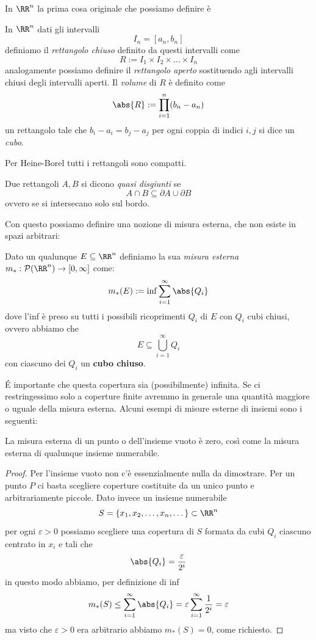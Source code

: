 \documentclass[11pt]{scrartcl}
\newcommand{\parti}[1]{\mathcal{P}\!\left(#1\right)}
\begin{document}
	In $\RR^n$ la prima cosa originale che possiamo definire è 
	\begin{definition}
		In $\RR^n$ dati gli intervalli
		$$I_n=\left[a_n,b_n\right]$$
		definiamo il \textit{rettangolo chiuso} definito da questi intervalli come
		$$R:= I_1\times I_2 \times \dots \times I_n$$
		analogamente possiamo definire il \textit{rettangolo aperto} sostituendo agli intervalli chiusi degli intervalli aperti. Il \textit{volume} di $R$ è definito come
		$$\abs{R}:= \prod_{i=1}^{n}(b_n-a_n)$$
		un rettangolo tale che $b_i-a_i=b_j-a_j$ per ogni coppia di indici $i,j$ si dice un \textit{cubo}.
	\end{definition}  
	Per Heine-Borel tutti i rettangoli sono compatti.
	\begin{definition}
		Due rettangoli $A, B$ si dicono \textit{quasi disgiunti} se 
		$$A\cap B \subseteq \partial A \cup \partial B $$
		ovvero se si intersecano solo sul bordo.
	\end{definition}
	Con questo possiamo definire una nozione di misura esterna, che non esiste in spazi arbitrari:
	\begin{definition}
		Dato un qualunque $E\subseteq\RR^n$ definiamo la sua \textit{misura esterna} $m_*:\parti{\RR^n}\to [0,\infty]$ come:
		$$m_*(E):=\inf\sum_{i=1}^{\infty}\abs{Q_i}$$
		dove l'inf è preso su tutti i possibili ricoprimenti $Q_i$ di $E$ con $Q_i$ cubi chiusi, ovvero abbiamo che 
		$$E\subseteq \bigcup_{i=1}^\infty Q_i$$
		con ciascuno dei $Q_i$ un \textbf{cubo chiuso}.
	\end{definition}
	\'E importante che questa copertura sia (possibilmente) infinita. Se ci restringessimo solo a coperture finite avremmo in generale una quantità maggiore o uguale della misura esterna.
	Alcuni esempi di misure esterne di insiemi sono i seguenti:
	\begin{example}[Punti]
		La misura esterna di un punto o dell'insieme vuoto è zero, così come la misura esterna di qualunque insieme numerabile.
	\end{example}
	\begin{proof}
		Per l'insieme vuoto non c'è essenzialmente nulla da dimostrare. Per un punto $P$ ci basta scegliere coperture costituite da un unico punto e arbitrariamente piccole. Dato invece un insieme numerabile 
		$$S=\left\{x_1,x_2,\dots,x_n,\dots\right\}\subset \RR^n$$
		per ogni $\varepsilon>0$ possiamo scegliere una copertura di $S$ formata da cubi $Q_i$ ciascuno centrato in $x_i$ e tali che
		$$\abs{Q_i}=\frac{\varepsilon}{2^i}$$
		in questo modo abbiamo, per definizione di inf
		$$m_*(S)\le \sum_{i=1}^{\infty}\abs{Q_i}=\varepsilon\sum_{i=1}^{\infty}\frac{1}{2^i}=\varepsilon$$
		ma visto che $\varepsilon>0$ era arbitrario abbiamo $m_*(S)=0$, come richiesto.
	\end{proof}
\end{document}
